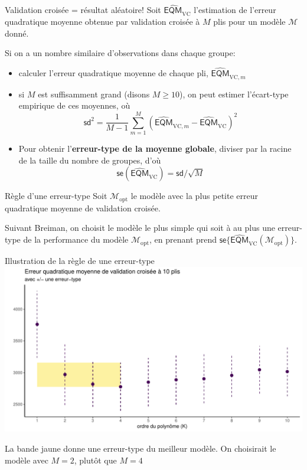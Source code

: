 \documentclass[
  ignorenonframetext,
]{beamer}
\providecommand{\tightlist}{%
  \setlength{\itemsep}{0pt}\setlength{\parskip}{0pt}}\usepackage{longtable,booktabs,array}
\begin{document}
\begin{frame}{Validation croisée = résultat aléatoire!}
\label{validation-croisuxe9e-ruxe9sultat-aluxe9atoire}
Soit \(\widehat{\mathsf{EQM}}_{\text{VC}}\) l'estimation de l'erreur
quadratique moyenne obtenue par validation croisée à \(M\) plis pour un
modèle \(\mathcal{M}\) donné.

Si on a un nombre similaire d'observations dans chaque groupe:

\begin{itemize}
\tightlist
\item
  calculer l'erreur quadratique moyenne de chaque pli,
  \(\widehat{\mathsf{EQM}}_{\text{VC}, m}\)
\item
  si \(M\) est suffisamment grand (disons \(M \geq 10\)), on peut
  estimer l'écart-type empirique de ces moyennes, où
  \[ \mathsf{sd}^2 = \frac{1}{M-1} \sum_{m=1}^{M} (\widehat{\mathsf{EQM}}_{\text{VC}, m}-\widehat{\mathsf{EQM}}_{\text{VC}})^2\]
\item
  Pour obtenir l'\textbf{erreur-type de la moyenne globale}, diviser par
  la racine de la taille du nombre de groupes, d'où
  \[\mathsf{se}(\widehat{\mathsf{EQM}}_{\text{VC}}) = \mathsf{sd}/\sqrt{M}\]
\end{itemize}
\end{frame}

\begin{frame}{Règle d'une erreur-type}
\label{ruxe8gle-dune-erreur-type}
Soit \(\mathcal{M}_{\text{opt}}\) le modèle avec la plus petite erreur
quadratique moyenne de validation croisée.

Suivant Breiman, on choisit le modèle le plus simple qui soit à au plus
une erreur-type de la performance du modèle
\(\mathcal{M}_{\text{opt}}\), en prenant prend
\(\mathsf{se}\{\widehat{\mathsf{EQM}}_{\text{VC}}(\mathcal{M}_{\text{opt}})\}\).
\end{frame}

\begin{frame}{Illustration de la règle de une erreur-type}
\label{illustration-de-la-ruxe8gle-de-une-erreur-type}
\includegraphics{figures/fig-validationcroisee-une-erreur-type.pdf}

La bande jaune donne une erreur-type du meilleur modèle. On choisirait
le modèle avec \(M=2\), plutôt que \(M=4\)
\end{frame}
\end{document}
